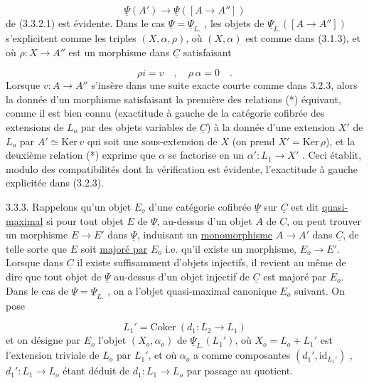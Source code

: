 \begin{equation*}
\underline{\Psi}(A') \longrightarrow \underline{\Psi}([A \longrightarrow A''])
\end{equation*}
de (3.3.2.1) est évidente. Dans le cas $\underline{\Psi} = \underline{\Psi}_{L.}$ , les objets de $\underline{\Psi}_{L.}([A \longrightarrow A''])$ s'explicitent comme les triples $(X,\alpha,\rho)$, où $(X,\alpha)$ est comme dans (3.1.3), et où $\rho : X \longrightarrow A''$ est un morphisme dans $\underline{C}$ satisfaisant

\begin{equation}\tag{*}
\rho i = v \quad , \quad \rho\, \alpha = 0 \quad .
\end{equation}
Lorsque $v: A \longrightarrow A''$ s'insère dans une suite exacte courte comme dans 3.2.3, alors la donnée d'un morphisme satisfaisant la première des relations (*) équivaut, comme il est bien connu (exactitude à gauche de la catégorie cofibrée des extensions de $L_o$ par des objets variables de $\underline{C}$) à la donnée d'une extension $X'$ de $L_o$ par $A' \simeq \mathrm{Ker}\, v$ qui soit une sous-extension de $X$ (on prend $X' = \mathrm{Ker}\, \rho$), et la deuxième relation (*) exprime que $\alpha$ se factorise en un $\alpha' : L_1 \longrightarrow X'$ . Ceci établit, modulo des compatibilités dont la vérification est évidente, l'exactitude à gauche explicitée dans (3.2.3).



3.3.3. Rappelons qu'un objet $E_o$ d'une catégorie cofibrée $\underline{\Psi}$ sur $\underline{C}$ est dit \underline{quasi-maximal} si pour tout objet $E$ de $\underline{\Psi}$, au-dessus d'un objet $A$ de $\underline{C}$, on peut trouver un morphisme $E \longrightarrow E'$ dans $\underline{\Psi}$, induisant un \underline{monomorphisme} $A \longrightarrow A'$ dans $\underline{C}$, de telle sorte que $E$ soit \underline{majoré par} $E_o$ i.e. qu'il existe un morphisme, $E_o \longrightarrow E'$. Lorsque dans $\underline{C}$ il existe suffisamment d'objets injectifs, il revient au même de dire que tout objet de $\underline{\Psi}$ au-dessus d'un objet injectif de $\underline{C}$ est majoré par $E_o$. Dans le cas de $\underline{\Psi} = \underline{\Psi}_{L.}$ , on a l'objet quasi-maximal canonique $E_o$ suivant. On pose

\begin{equation*}
L_1' = \mathrm{Coker}\ (d_1 : L_2 \longrightarrow L_1)
\end{equation*}
et on désigne par $E_o$ l'objet $(X_o,\alpha_o)$ de $\underline{\Psi}_{L.}(L_1')$, où $X_o = L_o + L_1'$ est l'extension triviale de $L_o$ par $L_1'$, et où $\alpha_o$ a comme composantes $(d_1',\mathrm{id}_{L_1'})$ , $d_1' : L_1 \longrightarrow L_o$ étant déduit de $d_1 : L_1 \longrightarrow L_o$ par passage au quotient.

